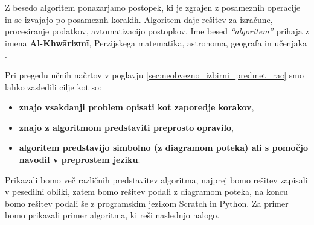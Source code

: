 Z besedo algoritem ponazarjamo postopek, ki je zgrajen z posameznih
operacije in se izvajajo po posameznh korakih. Algoritem daje rešitev
za izračune, procesiranje podatkov, avtomatizacijo postopkov.
Ime besed \emph{``algoritem''} prihaja z imena \textbf{Al-Khwārizmī},
Perzijskega matematika, astronoma, geografa in učenjaka \cite{wiki:algorithem}.

Pri pregedu učnih načrtov v poglavju
\ref{sec:neobvezno_izbirni_predmet_rac} smo lahko zasledili cilje kot
so:

\begin{itemize}
\tightlist
\item \textbf{znajo vsakdanji problem opisati kot zaporedje korakov},
\item \textbf{znajo z algoritmom predstaviti preprosto opravilo},
\item \textbf{algoritem predstavijo simbolno (z diagramom poteka) ali s
  pomočjo navodil v preprostem jeziku}.
\end{itemize}


Prikazali bomo več različnih predstavitev algoritma, najprej bomo
rešitev zapisali v pesedilni obliki, zatem bomo rešitev podali z
diagramom poteka, na koncu bomo rešitev podali še z programskim
jezikom Scratch in Python.  Za primer bomo prikazali primer algoritma,
ki reši naslednjo nalogo.



